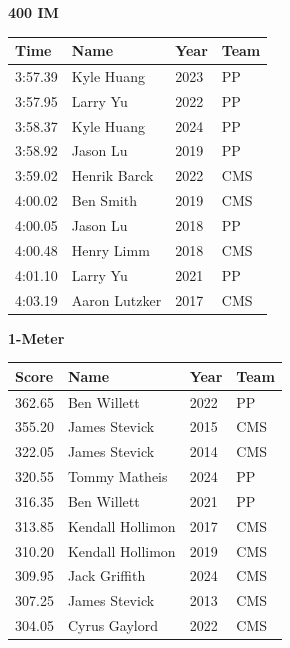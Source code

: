 \vspace{1.2em}
\noindent\begin{minipage}[t]{0.98\textwidth}
\centering
\textbf{\textcolor{teamprimary}{400 IM}}\par
\vspace{0.5em}
\centering
\small
\renewcommand{\arraystretch}{1.0}
\setlength{\tabcolsep}{4pt}
\begin{tabular}{@{}p{2.5cm}p{4.5cm}p{1.5cm}p{2.5cm}@{}}
\toprule
\textbf{Time} & \textbf{Name} & \textbf{Year} & \textbf{Team} \\
\midrule
3:57.39 & Kyle Huang & 2023 & PP \\
3:57.95 & Larry Yu & 2022 & PP \\
3:58.37 & Kyle Huang & 2024 & PP \\
3:58.92 & Jason Lu & 2019 & PP \\
3:59.02 & Henrik Barck & 2022 & CMS \\
4:00.02 & Ben Smith & 2019 & CMS \\
4:00.05 & Jason Lu & 2018 & PP \\
4:00.48 & Henry Limm & 2018 & CMS \\
4:01.10 & Larry Yu & 2021 & PP \\
4:03.19 & Aaron Lutzker & 2017 & CMS \\
\bottomrule
\end{tabular}
\end{minipage}
\vspace{1.2em}
\noindent\begin{minipage}[t]{0.98\textwidth}
\centering
\textbf{\textcolor{teamprimary}{1-Meter}}\par
\vspace{0.5em}
\centering
\small
\renewcommand{\arraystretch}{1.0}
\setlength{\tabcolsep}{4pt}
\begin{tabular}{@{}p{2.5cm}p{4.5cm}p{1.5cm}p{2.5cm}@{}}
\toprule
\textbf{Score} & \textbf{Name} & \textbf{Year} & \textbf{Team} \\
\midrule
362.65 & Ben Willett & 2022 & PP \\
355.20 & James Stevick & 2015 & CMS \\
322.05 & James Stevick & 2014 & CMS \\
320.55 & Tommy Matheis & 2024 & PP \\
316.35 & Ben Willett & 2021 & PP \\
313.85 & Kendall Hollimon & 2017 & CMS \\
310.20 & Kendall Hollimon & 2019 & CMS \\
309.95 & Jack Griffith & 2024 & CMS \\
307.25 & James Stevick & 2013 & CMS \\
304.05 & Cyrus Gaylord & 2022 & CMS \\
\bottomrule
\end{tabular}
\end{minipage}
